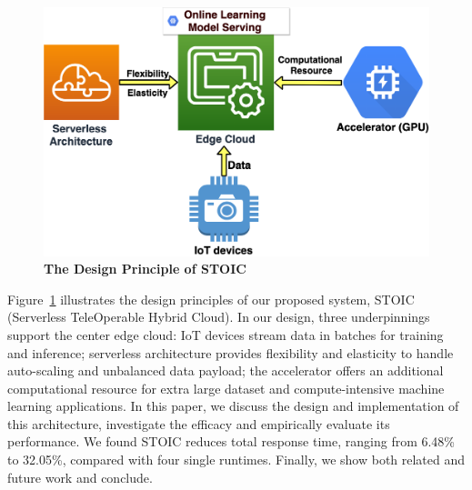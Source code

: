 \begin{figure}
    \centering
    \includegraphics[scale=0.25]{figures/edge}
    \caption{\textbf{The Design Principle of STOIC}}
    \label{fig:edge}
\end{figure}

Figure~\ref{fig:edge} illustrates the design principles of our proposed system, STOIC (Serverless TeleOperable Hybrid Cloud). In our design, three underpinnings support the center edge cloud: IoT devices stream data in batches for training and inference; serverless architecture provides flexibility and elasticity to handle auto-scaling and unbalanced data payload; the accelerator offers an additional computational resource for extra large dataset and compute-intensive machine learning applications. In this paper, we discuss the design and implementation of this architecture, investigate the efficacy and  empirically evaluate its performance. We found STOIC reduces total response time, ranging from 6.48\% to 32.05\%, compared with four single runtimes. Finally, we show both related and future work and conclude.
